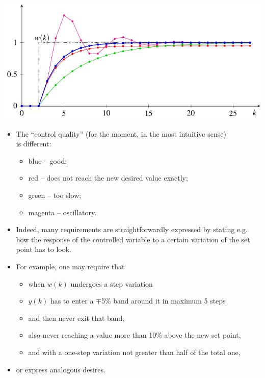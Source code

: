 \begin{frame}
\framesubtitleTC{}
\myPause
 \begin{center}
  \includegraphics[width=0.40\columnwidth]{./Unit-04/img/StepRespForRequirements.pdf}
 \end{center}\myPause
 \begin{itemize}[<+-| alert@+>]
 \item The ``control quality'' (for the moment, in the most intuitive sense)\\
       is different:
       \begin{itemize}[<+-| alert@+>]
       \item \textcolor{blue!80!black}{blue} -- good;
       \item \textcolor{red!95!black}{red} -- does not reach the new desired value exactly;
       \item \textcolor{green!80!black}{green} -- too slow;
       \item \textcolor{magenta!95!black}{magenta} -- oscillatory.
       \end{itemize}
 \end{itemize}
\end{frame}

\begin{frame}
\framesubtitleTC{}
\myPause
 \begin{itemize}[<+-| alert@+>]
 \item Indeed, many requirements are straightforwardly expressed by stating e.g. how the response
       of the controlled variable to a certain variation of the set point has to look.
 \item For example, one may require that
       \begin{itemize}[<+-| alert@+>]
       \item[] when $w(k)$ undergoes a step variation
       \item[] $y(k)$ has to enter a $\mp$5\% band around it in maximum 5 steps
       \item[] and then never exit that band,
       \item[] also never reaching a value more than 10\% above the new set point,
       \item[] and with a one-step variation not greater than half of the total one,
       \end{itemize}
 \item[] or express analogous desires.
 \end{itemize}
\end{frame}

